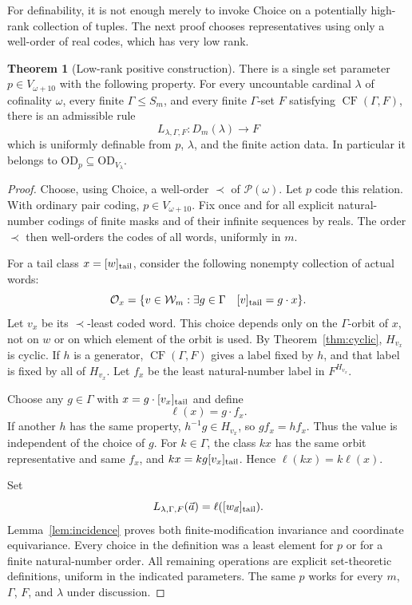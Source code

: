 \documentclass[11pt,letterpaper]{article}
\theoremstyle{definition}
\newtheorem{theorem}[definition]{Theorem}
\numberwithin{equation}{section}
\newcommand{\OD}{\mathrm{OD}}
\newcommand{\Pow}{\mathcal P}
\newcommand{\CF}{\operatorname{CF}}
\newcommand{\W}{\mathcal W}
\begin{document}
For definability, it is not enough merely to invoke Choice on a potentially high-rank collection of tuples. The next proof chooses representatives using only a well-order of real codes, which has very low rank.

\begin{theorem}[Low-rank positive construction]\label{thm:positive}
There is a single set parameter $p\in V_{\omega+10}$ with the following property. For every uncountable cardinal $\lambda$ of cofinality $\omega$, every finite $\Gamma\le S_m$, and every finite $\Gamma$-set $F$ satisfying $\CF(\Gamma,F)$, there is an admissible rule
\[
 L_{\lambda,\Gamma,F}:D_m(\lambda)\to F
\]
which is uniformly definable from $p$, $\lambda$, and the finite action data. In particular it belongs to $\OD_p\subseteq\OD_{V_\lambda}$.
\end{theorem}

\begin{proof}
Choose, using Choice, a well-order $\prec$ of $\Pow(\omega)$. Let $p$ code this relation. With ordinary pair coding, $p\in V_{\omega+10}$. Fix once and for all explicit natural-number codings of finite masks and of their infinite sequences by reals. The order $\prec$ then well-orders the codes of all words, uniformly in $m$.

For a tail class $x=[w]_{\rm tail}$, consider the following nonempty collection of actual words:
\[
 \mathcal O_x=\{v\in\W_m:\exists g\in\Gamma\quad
                  [v]_{\rm tail}=g\cdot x\}.
\]
Let $v_x$ be its $\prec$-least coded word. This choice depends only on the $\Gamma$-orbit of $x$, not on $w$ or on which element of the orbit is used. By Theorem~\ref{thm:cyclic}, $H_{v_x}$ is cyclic. If $h$ is a generator, $\CF(\Gamma,F)$ gives a label fixed by $h$, and that label is fixed by all of $H_{v_x}$. Let $f_x$ be the least natural-number label in $F^{H_{v_x}}$.

Choose any $g\in\Gamma$ with $x=g\cdot[v_x]_{\rm tail}$ and define
\begin{equation}\label{eq:constructedell}
 \ell(x)=g\cdot f_x.
\end{equation}
If another $h$ has the same property, $h^{-1}g\in H_{v_x}$, so $g f_x=h f_x$. Thus the value is independent of the choice of $g$. For $k\in\Gamma$, the class $kx$ has the same orbit representative and same $f_x$, and $kx=kg[v_x]_{\rm tail}$. Hence $\ell(kx)=k\ell(x)$.

Set
\[
 L_{\lambda,\Gamma,F}(\vec a)=\ell([w_{\vec a}]_{\rm tail}).
\]
Lemma~\ref{lem:incidence} proves both finite-modification invariance and coordinate equivariance. Every choice in the definition was a least element for $p$ or for a finite natural-number order. All remaining operations are explicit set-theoretic definitions, uniform in the indicated parameters. The same $p$ works for every $m$, $\Gamma$, $F$, and $\lambda$ under discussion.
\end{proof}
\end{document}
